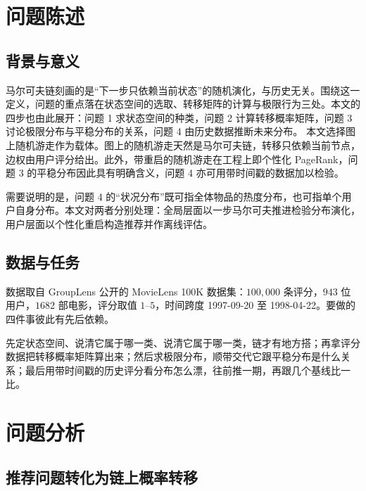 \documentclass[12pt,a4paper]{ctexart}
\begin{document}
\newpage
\tableofcontents
\newpage

\section{问题陈述}

\subsection{背景与意义}

马尔可夫链刻画的是“下一步只依赖当前状态”的随机演化，与历史无关\cite{norris}。围绕这一定义，问题的重点落在状态空间的选取、转移矩阵的计算与极限行为三处。本文的四步也由此展开：问题 1 求状态空间的种类，问题 2 计算转移概率矩阵，问题 3 讨论极限分布与平稳分布的关系，问题 4 由历史数据推断未来分布。
本文选择图上随机游走作为载体。图上的随机游走天然是马尔可夫链，转移只依赖当前节点，边权由用户评分给出。此外，带重启的随机游走在工程上即个性化 PageRank\cite{page,haveliwala}，问题 3 的平稳分布因此具有明确含义，问题 4 亦可用带时间戳的数据加以检验。

需要说明的是，问题 4 的“状况分布”既可指全体物品的热度分布，也可指单个用户自身分布。本文对两者分别处理：全局层面以一步马尔可夫推进检验分布演化，用户层面以个性化重启构造推荐并作离线评估。

\subsection{数据与任务}

数据取自 GroupLens 公开的 MovieLens 100K 数据集\cite{movielens}：$100{,}000$ 条评分，$943$ 位用户，$1682$ 部电影，评分取值 $1$--$5$，时间跨度 1997-09-20 至 1998-04-22。要做的四件事彼此有先后依赖。

先定状态空间、说清它属于哪一类、说清它属于哪一类，链才有地方搭；再拿评分数据把转移概率矩阵算出来；然后求极限分布，顺带交代它跟平稳分布是什么关系；最后用带时间戳的历史评分看分布怎么漂，往前推一期，再跟几个基线比一比。

\section{问题分析}

\subsection{推荐问题转化为链上概率转移}
\end{document}
